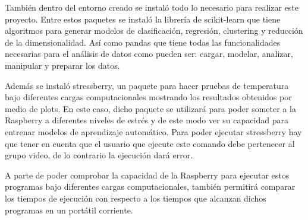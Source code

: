 \documentclass[a4paper, 12pt]{book}
\begin{document}
También dentro del entorno creado se instaló todo lo necesario para realizar este proyecto. Entre estos paquetes se instaló la librería de scikit-learn que tiene algoritmos para generar modelos de clasificación, regresión, clustering y reducción de la dimensionalidad. Así como pandas que tiene todas las funcionalidades necesarias para el análisis de datos como pueden ser: cargar, modelar, analizar, manipular y preparar los datos.

Además se instaló stressberry, un paquete para hacer pruebas de temperatura bajo diferentes cargas computacionales mostrando los resultados obtenidos por medio de plots. En este caso, dicho paquete se utilizará para poder someter a la Raspberry a diferentes niveles de estrés y de este modo ver su capacidad para entrenar modelos de aprendizaje automático. Para poder ejecutar stressberry hay que tener en cuenta que el usuario que ejecute este comando debe pertenecer al grupo video, de lo contrario la ejecución dará error.

A parte de poder comprobar la capacidad de la Raspberry para ejecutar estos programas bajo diferentes cargas computacionales, también permitirá comparar los tiempos de ejecución con respecto a los tiempos que alcanzan dichos programas en un portátil corriente.


\printglossary[type=\acronymtype]

\printglossary





\cleardoublepage

%
% 

\raggedright\printbibliography[heading=bibintoc,title={Referencias}]
\end{document}
